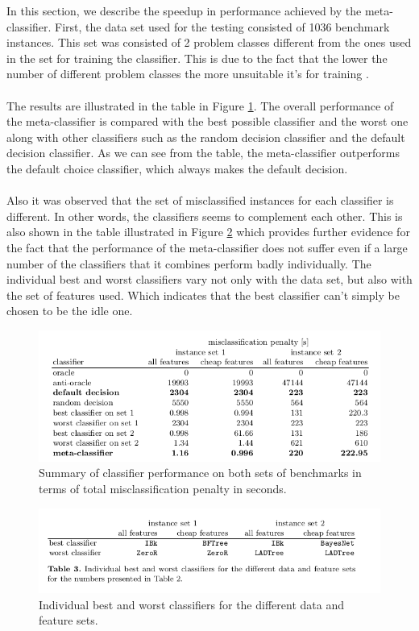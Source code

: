 In this section, we describe the speedup in performance achieved by the meta-classifier. First, the data set used for the testing consisted of 1036 benchmark instances. This set was consisted of 2 problem classes different from  the ones used in the set for training the classifier. This is due to the fact that the lower the number of different problem classes the more unsuitable it's for training \cite{ml:csd}.
\\\\
The results are illustrated in the table in Figure \ref{fig:results}. The overall performance of the meta-classifier is compared with the best possible classifier and the worst one along with other classifiers such as the random decision classifier and the default decision classifier. As we can see from the table, the meta-classifier outperforms the default choice classifier, which always makes the default decision.
\\\\
Also it was observed that the set of misclassified instances for each classifier is different. In other words, the classifiers seems to complement each other. This is also shown in the table illustrated in Figure \ref{fig2:results} which provides further evidence for the fact that the performance of the meta-classifier does not suffer even if a large number of the classifiers that it combines perform badly individually. The individual best and worst classifiers vary not only with the data set, but also with the set of features used. Which indicates that the best classifier can't simply be chosen to be the idle one\cite{ml:csd}.

\clearpage
\begin{figure}[h!]
  \vspace{1 cm}
  \includegraphics[width=1.0\textwidth]{images/results.png}
  \caption[ ]{Summary of classifier performance on both sets of benchmarks in terms of
total misclassification penalty in seconds.}
  \label{fig:results}
\end{figure}

\begin{figure}[h!]
  \vspace{1 cm}
  \includegraphics[width=1.0\textwidth]{images/results2.png}
  \caption[ ]{Individual best and worst classifiers for the different data and feature sets.}
  \label{fig2:results}
\end{figure}
